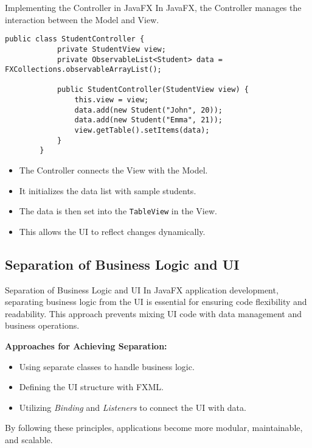 \documentclass[aspectratio=169, table]{beamer}
\begin{document}
\begin{frame}[fragile]{Implementing the Controller in JavaFX}
	\vspace{20pt}
	In JavaFX, the Controller manages the interaction between the Model and View.  
	
	\begin{lstlisting}[style=JavaStyle]
		public class StudentController {
			private StudentView view;
			private ObservableList<Student> data = FXCollections.observableArrayList();
			
			public StudentController(StudentView view) {
				this.view = view;
				data.add(new Student("John", 20));
				data.add(new Student("Emma", 21));
				view.getTable().setItems(data);
			}
		}
	\end{lstlisting}
	
	\begin{itemize}
		\item The Controller connects the View with the Model.
		\item It initializes the data list with sample students.
		\item The data is then set into the \texttt{TableView} in the View.
		\item This allows the UI to reflect changes dynamically.
	\end{itemize}
\end{frame}

\subsection{Separation of Business Logic and UI}

\begin{frame}[fragile]{Separation of Business Logic and UI}
	\vspace{20pt}
	In JavaFX application development, separating business logic from the UI  
	is essential for ensuring code flexibility and readability.  
	This approach prevents mixing UI code with data management and business operations.
	
	\bigskip
	\textbf{Approaches for Achieving Separation:}
	\begin{itemize}
		\item Using separate classes to handle business logic.
		\item Defining the UI structure with FXML.
		\item Utilizing \textit{Binding} and \textit{Listeners} to connect the UI with data.
	\end{itemize}
	
	\bigskip
	By following these principles, applications become more modular,  
	maintainable, and scalable.
\end{frame}
\end{document}
